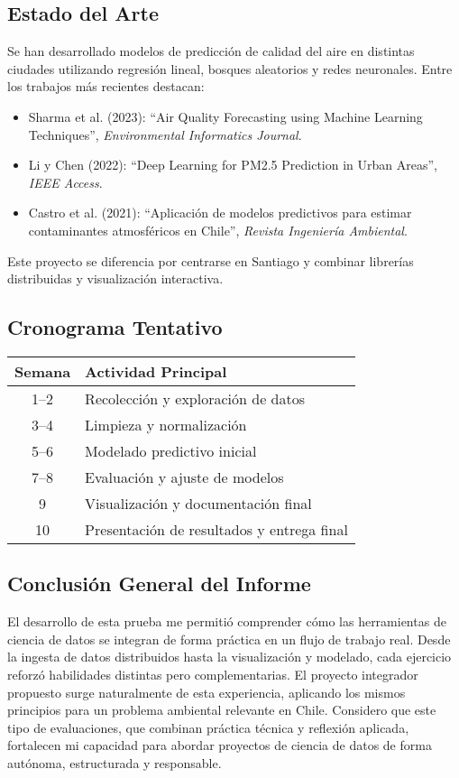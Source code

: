 \documentclass[12pt,a4paper]{article}
\begin{document}
\subsection{Estado del Arte}
Se han desarrollado modelos de predicción de calidad del aire en distintas ciudades utilizando regresión lineal, bosques aleatorios y redes neuronales.  
Entre los trabajos más recientes destacan:
\begin{itemize}
    \item Sharma et al. (2023): ``Air Quality Forecasting using Machine Learning Techniques'', \textit{Environmental Informatics Journal}.
    \item Li y Chen (2022): ``Deep Learning for PM2.5 Prediction in Urban Areas'', \textit{IEEE Access}.
    \item Castro et al. (2021): ``Aplicación de modelos predictivos para estimar contaminantes atmosféricos en Chile'', \textit{Revista Ingeniería Ambiental}.
\end{itemize}
Este proyecto se diferencia por centrarse en Santiago y combinar librerías distribuidas y visualización interactiva.

\subsection{Cronograma Tentativo}
\begin{center}
\begin{tabular}{|c|l|}
\hline
\textbf{Semana} & \textbf{Actividad Principal} \\ \hline
1–2 & Recolección y exploración de datos \\
3–4 & Limpieza y normalización \\
5–6 & Modelado predictivo inicial \\
7–8 & Evaluación y ajuste de modelos \\
9 & Visualización y documentación final \\
10 & Presentación de resultados y entrega final \\ \hline
\end{tabular}
\end{center}

\subsection{Conclusión General del Informe}

El desarrollo de esta prueba me permitió comprender cómo las herramientas de ciencia de datos se integran de forma práctica en un flujo de trabajo real.  
Desde la ingesta de datos distribuidos hasta la visualización y modelado, cada ejercicio reforzó habilidades distintas pero complementarias.  
El proyecto integrador propuesto surge naturalmente de esta experiencia, aplicando los mismos principios para un problema ambiental relevante en Chile.  
Considero que este tipo de evaluaciones, que combinan práctica técnica y reflexión aplicada, fortalecen mi capacidad para abordar proyectos de ciencia de datos de forma autónoma, estructurada y responsable.
\end{document}

